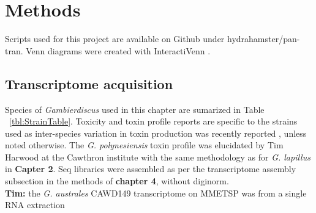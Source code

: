 \documentclass[12pt]{article}
\begin{document}


\newpage
\section*{Methods}
Scripts used for this project are available on Github under hydrahamster/pan-tran. 
Venn diagrams were created with InteractiVenn \cite{heberle2015venn}. 
\subsection*{Transcriptome acquisition}
Species of \textit{Gambierdiscus} used in this chapter are sumarized in Table ~\ref{tbl:StrainTable}. 
Toxicity and toxin profile reports are specific to the strains used as inter-species variation in toxin production was recently reported \cite{larsson2018toxicology,rhodes2017epiphytic}, unless noted otherwise. 
The \textit{G. polynesiensis} toxin profile was elucidated by Tim Harwood at the Cawthron institute with the same methodology as for \textit{G. lapillus} in \textbf{Capter 2}. 
Seq libraries were assembled as per the transcriptome assembly subsection in the methods of \textbf{chapter 4}, without diginorm. \\
\textbf{Tim:} the \textit{G. australes} CAWD149 transcriptome on MMETSP was from a single RNA extraction
\end{document}
